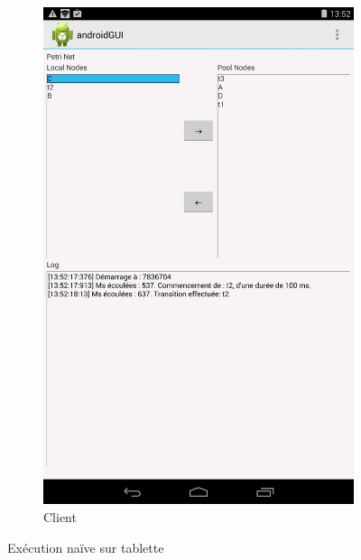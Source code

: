 \begin{figure}
		\vspace{1cm}
		
		
		\begin{subfigure}{0.5\textwidth}
			\centering
			\includegraphics[scale=0.16]{images/resultats/client_simple_wifi.png}
			\caption{Client}
		\end{subfigure}
		
		\caption{Exécution naïve sur tablette}
		\label{fig.androSimpl}
	\end{figure}
	
